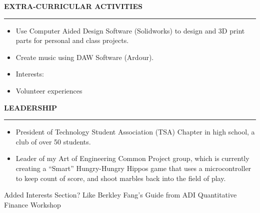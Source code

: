 \documentclass[10pt,letterpaper]{article}
\begin{document}
\medskip
\MakeUppercase{{\bf Extra-Curricular Activities}} %
\medskip
\hrule %
\begin{list}{}{\setlength{\leftmargin}{0em}}
\item
\begin{itemize}
    \item Use Computer Aided Design Software (Solidworks) to design and 3D print parts for personal and class projects. %
    \item Create music using DAW Software (Ardour).
    \item Interests: 
    \item Volunteer experiences
\end{itemize}
\end{list}



\medskip
\MakeUppercase{{\bf Leadership}} %
\medskip
\hrule %
\begin{list}{}{\setlength{\leftmargin}{0em}}
\item
\begin{itemize}
    \item President of Technology Student Association (TSA) Chapter in high school, a club of over 50 students.
    \item Leader of my Art of Engineering Common Project group, which is currently creating a ``Smart'' Hungry-Hungry Hippos game that uses a microcontroller to keep count of score, and shoot marbles back into the field of play.
\end{itemize}
\end{list}

Added Interests Section? Like Berkley Fang's Guide from ADI Quantitative Finance Workshop
\end{document}
